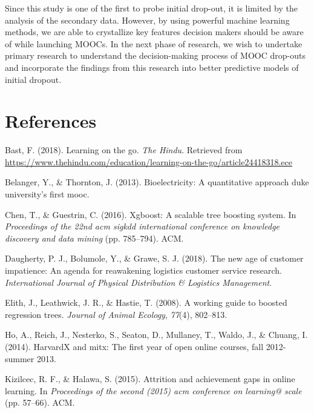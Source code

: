 \documentclass[12pt,]{article}
\begin{document}
Since this study is one of the first to probe initial drop-out, it is
limited by the analysis of the secondary data. However, by using
powerful machine learning methods, we are able to crystallize key
features decision makers should be aware of while launching MOOCs. In
the next phase of research, we wish to undertake primary research to
understand the decision-making process of MOOC drop-outs and incorporate
the findings from this research into better predictive models of initial
dropout.

\newpage 

\section*{References}\label{references}

\hypertarget{refs}{}
\hypertarget{ref-bast2018swayam}{}
Bast, F. (2018). Learning on the go. \emph{The Hindu}. Retrieved from
\url{https://www.thehindu.com/education/learning-on-the-go/article24418318.ece}

\hypertarget{ref-belanger2013bioelectricity}{}
Belanger, Y., \& Thornton, J. (2013). Bioelectricity: A quantitative
approach duke university's first mooc.

\hypertarget{ref-chen2016xgboost}{}
Chen, T., \& Guestrin, C. (2016). Xgboost: A scalable tree boosting
system. In \emph{Proceedings of the 22nd acm sigkdd international
conference on knowledge discovery and data mining} (pp. 785--794). ACM.

\hypertarget{ref-daugherty2018impatience}{}
Daugherty, P. J., Bolumole, Y., \& Grawe, S. J. (2018). The new age of
customer impatience: An agenda for reawakening logistics customer
service research. \emph{International Journal of Physical Distribution
\& Logistics Management}.

\hypertarget{ref-elith2008working}{}
Elith, J., Leathwick, J. R., \& Hastie, T. (2008). A working guide to
boosted regression trees. \emph{Journal of Animal Ecology},
\emph{77}(4), 802--813.

\hypertarget{ref-ho2014harvardx}{}
Ho, A., Reich, J., Nesterko, S., Seaton, D., Mullaney, T., Waldo, J., \&
Chuang, I. (2014). HarvardX and mitx: The first year of open online
courses, fall 2012-summer 2013.

\hypertarget{ref-kizilcec2015attrition}{}
Kizilcec, R. F., \& Halawa, S. (2015). Attrition and achievement gaps in
online learning. In \emph{Proceedings of the second (2015) acm
conference on learning@ scale} (pp. 57--66). ACM.
\end{document}
